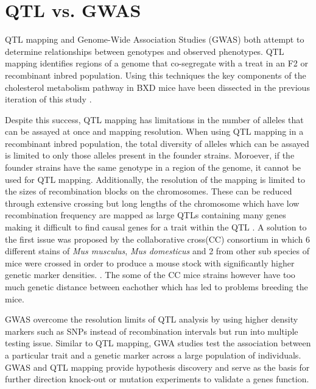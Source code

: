 \documentclass[a4paper,11pt,twoside]{book}
\begin{document}
	\section{QTL vs. GWAS}
	\label{sec:QTL vs. GWAS}
	
	QTL mapping and Genome-Wide Association Studies (GWAS) both attempt to determine relationships between genotypes and observed phenotypes. QTL mapping identifies regions of a genome that co-segregate with a treat in an F2 or recombinant inbred population. Using this techniques the key components of the cholesterol metabolism pathway in BXD mice have been dissected in the previous iteration of this study \citep{Williams2016SystemsFunction}. 
	
	Despite this success, QTL mapping has limitations in the number of alleles that can be assayed at once and mapping resolution. When using QTL mapping in a recombinant inbred population, the total diversity of alleles which can be assayed is limited to only those alleles present in the founder strains. Moroever, if the founder strains have the same genotype in a region of the genome, it cannot be used for QTL mapping. Additionally, the resolution of the mapping is limited to the sizes of recombination blocks on the chromosomes\citep{Korte2013Thereview}. These can be reduced through extensive crossing but long lengths of the chromosome which have low recombination frequency are mapped as large QTLs containing many genes making it difficult to find causal genes for a trait within the QTL \citep{Korte2013Thereview}. A solution to the first issue was proposed by the collaborative cross(CC) consortium in which 6 different stains of \textit{Mus musculus}, \textit{Mus domesticus} and 2 from other sub species of mice were crossed in order to produce a mouse stock with significantly higher genetic marker densities. \citep{CollaborativeCrossConsortium2012ThePopulation.}. The some of the CC mice strains however have too much genetic distance between eachother which has led to problems breeding the mice.
	
	GWAS overcome the resolution limits of QTL analysis by using higher density markers such as SNPs instead of recombination intervals but run into multiple testing issue. Similar to QTL mapping, GWA studies test the association between a particular trait and a genetic marker across a large population of individuals. GWAS and QTL mapping provide hypothesis discovery and serve as the basis for further direction knock-out or mutation experiments to validate a genes function. 
	
\end{document}
